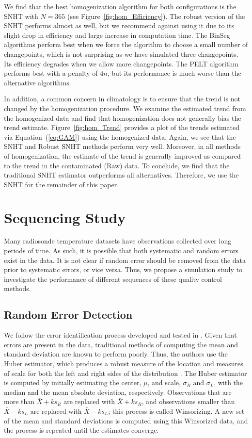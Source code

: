 \documentclass[12pt]{article}
\begin{document}
\begin{doublespacing}
We find that the best homogenization algorithm for both configurations is the SNHT with $N=365$ (see Figure~\ref{fig:hom_Efficiency}).  The robust version of the SNHT performs almost as well, but we recommend against using it due to its slight drop in efficiency and large increase in computation time.  The BinSeg algorithms perform best when we force the algorithm to choose a small number of changepoints, which is not surprising as we have simulated three changepoints.  Its efficiency degrades when we allow more changepoints.  The PELT algorithm performs best with a penalty of $4n$, but its performance is much worse than the alternative algorithms.

In addition, a common concern in climatology is to ensure that the trend is not changed by the homogenization procedure.  We examine the estimated trend from the homogenized data and find that homogenization does not generally bias the trend estimate.  Figure~\ref{fig:hom_Trend} provides a plot of the trends estimated via Equation~(\ref{eq:GAM}) using the homogenized data.  Again, we see that the SNHT and Robust SNHT methods perform very well.  Moreover, in all methods of homogenization, the estimate of the trend is generally improved as compared to the trend in the contaminated (Raw) data.  To conclude, we find that the traditional SNHT estimator outperforms all alternatives.  Therefore, we use the SNHT  for the remainder of this paper.
\section{Sequencing Study}

Many radiosonde temperature datasets have observations collected over long periods of time.  As such, it is possible that both systematic and random errors exist in the data.  It is not clear if random error should be removed from the data prior to systematic errors, or vice versa.  Thus, we propose a simulation study to investigate the performance of different sequences of these quality control methods.

\subsection{Random Error Detection}
We follow the error identification process developed and tested in \cite{bell14}.  Given that errors are present in the data, traditional methods of computing the mean and standard deviation are known to perform poorly.  Thus, the authors use the Huber estimator, which produces a robust measure of the location and measures of scale for both the left and right sides of the distribution \cite{huber11}.  The Huber estimator is computed by initially estimating the center, $\mu$, and scale, $\sigma_R$ and $\sigma_L$, with the median and the mean absolute deviation, respectively.  Observations that are more than $\bar{X}+k s_R$ are replaced with $\bar{X}+ k s_R$, and observations smaller than $\bar{X}-k s_L$ are replaced with $\bar{X}-k s_L$; this process is called Winsorizing.  A new set of the mean and standard deviations is computed using this Winsorized data, and the process is repeated until the estimates converge.


\end{doublespacing}
\end{document}
